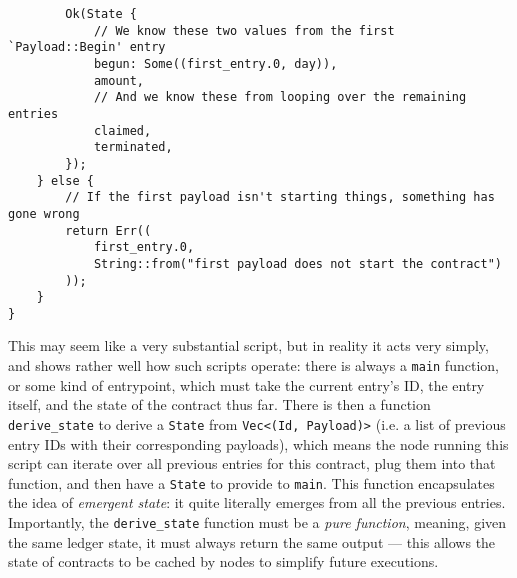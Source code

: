 \documentclass{extreport}
\begin{document}
\begin{verbatim}
        Ok(State {
            // We know these two values from the first `Payload::Begin' entry
            begun: Some((first_entry.0, day)),
            amount,
            // And we know these from looping over the remaining entries
            claimed,
            terminated,
        });
    } else {
        // If the first payload isn't starting things, something has gone wrong
        return Err((
            first_entry.0,
            String::from("first payload does not start the contract")
        ));
    }
}
\end{verbatim}

This may seem like a very substantial script, but in reality it acts very simply, and shows rather well how such scripts operate: there is always a \texttt{main} function, or some kind of entrypoint, which must take the current entry's ID, the entry itself, and the state of the contract thus far. There is then a function \texttt{derive\_state} to derive a \texttt{State} from \texttt{Vec<(Id, Payload)>} (i.e. a list of previous entry IDs with their corresponding payloads), which means the node running this script can iterate over all previous entries for this contract, plug them into that function, and then have a \texttt{State} to provide to \texttt{main}. This function encapsulates the idea of \emph{emergent state}: it quite literally emerges from all the previous entries. Importantly, the \texttt{derive\_state} function must be a \emph{pure function}, meaning, given the same ledger state, it must always return the same output --- this allows the state of contracts to be cached by nodes to simplify future executions.
\end{document}
